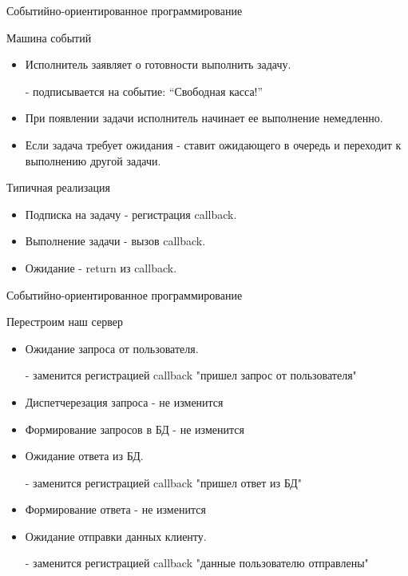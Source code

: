 \documentclass[aspectratio=169]{beamer}
\begin{document}
\begin{frame}{Событийно-ориентированное программирование}
    \begin{block}{Машина событий}
        \begin{itemize}

            \item Исполнитель заявляет о готовности выполнить задачу.
                \par - подписывается на событие: ``Свободная касса!''

            \item При появлении задачи исполнитель начинает
                ее выполнение немедленно.

            \item Если задача требует ожидания - ставит ожидающего
                в очередь и переходит к выполнению другой задачи.

        \end{itemize}
    \end{block}

    \pause
    \begin{block}{Типичная реализация}
        \begin{itemize}
            \item Подписка на задачу - регистрация callback.
            \item Выполнение задачи - вызов callback.
            \item Ожидание - return из callback.
        \end{itemize}

    \end{block}
\end{frame}

\begin{frame}{Событийно-ориентированное программирование}
    \begin{block}{Перестроим наш сервер}
        \begin{itemize}
            \item Ожидание запроса от пользователя.
                \par - заменится регистрацией callback
                    "пришел запрос от пользователя"
            \item Диспетчерезация запроса - не изменится
            \item Формирование запросов в БД - не изменится
            \item Ожидание ответа из БД.
                \par - заменится регистрацией callback
                        "пришел ответ из БД"
            \item Формирование ответа - не изменится
            \item Ожидание отправки данных клиенту.
                \par - заменится регистрацией callback
                        "данные пользователю отправлены"
        \end{itemize}
    \end{block}
\end{frame}
\end{document}
